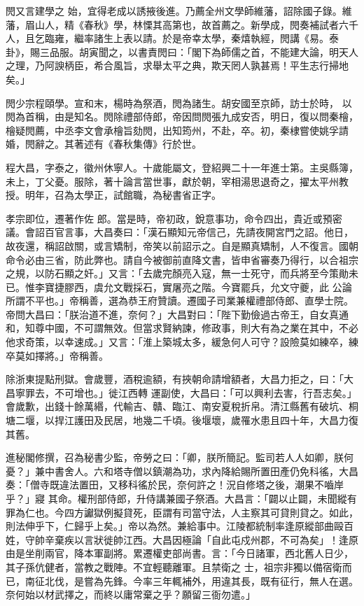 \begin{pinyinscope}
 閌又言建學之
 始，宜得老成以誘掖後進。乃薦全州文學師維藩，詔除國子錄。維藩，眉山人，精《春秋》學，林慄其高第也，故首薦之。新學成，閌奏補試者六千人，且乞臨雍，繼率諸生上表以請。於是帝幸太學，秦熺執經，閌講《易。泰卦》，賜三品服。胡寅聞之，以書責閌曰：「閣下為師儒之首，不能建大論，明天人之理，乃阿諛柄臣，希合風旨，求舉太平之典，欺天罔人孰甚焉！平生志行掃地矣。」



 閌少宗程頤學。宣和末，楊時為祭酒，閌為諸生。胡安國至京師，訪士於時，
 以閌為首稱，由是知名。閌除禮部侍郎，帝因問閌張九成安否，明日，復以問秦檜，檜疑閌薦，中丞李文會承檜旨劾閌，出知筠州，不赴，卒。初，秦棣嘗使姚孚請婚，閌辭之。其著述有《春秋集傳》行於世。



 程大昌，字泰之，徽州休寧人。十歲能屬文，登紹興二十一年進士第。主吳縣簿，未上，丁父憂。服除，著十論言當世事，獻於朝，宰相湯思退奇之，擢太平州教授。明年，召為太學正，試館職，為秘書省正字。



 孝宗即位，遷著作佐
 郎。當是時，帝初政，銳意事功，命令四出，貴近或預密議。會詔百官言事，大昌奏曰：「漢石顯知元帝信己，先請夜開宮門之詔。他日，故夜還，稱詔啟關，或言矯制，帝笑以前詔示之。自是顯真矯制，人不復言。國朝命令必由三省，防此弊也。請自今被御前直降文書，皆申省審奏乃得行，以合祖宗之規，以防石顯之奸。」又言：「去歲完顏亮入寇，無一士死守，而兵將至今策勛未已。惟李寶捷膠西，虞允文戰採石，實屠亮之階。今寶罷兵，允文守夔，此
 公論所謂不平也。」帝稱善，選為恭王府贊讀。遷國子司業兼權禮部侍郎、直學士院。帝問大昌曰：「朕治道不進，奈何？」大昌對曰：「陛下勤儉過古帝王，自女真通和，知尊中國，不可謂無效。但當求賢納諫，修政事，則大有為之業在其中，不必他求奇策，以幸速成。」又言：「淮上築城太多，緩急何人可守？設險莫如練卒，練卒莫如擇將。」帝稱善。



 除浙東提點刑獄。會歲豐，酒稅逾額，有挾朝命請增額者，大昌力拒之，曰：「大昌寧罪去，不可增也。」徙江西轉
 運副使，大昌曰：「可以興利去害，行吾志矣。」會歲歉，出錢十餘萬緡，代輸吉、贛、臨江、南安夏稅折帛。清江縣舊有破坑、桐塘二堰，以捍江護田及民居，地幾二千頃。後堰壞，歲罹水患且四十年，大昌力復其舊。



 進秘閣修撰，召為秘書少監，帝勞之曰：「卿，朕所簡記。監司若人人如卿，朕何憂？」兼中書舍人。六和塔寺僧以鎮潮為功，求內降給賜所置田產仍免科徭，大昌奏：「僧寺既違法置田，又移科徭於民，奈何許之！況自修塔之後，潮果不嚙岸乎？」寢
 其命。權刑部侍郎，升侍講兼國子祭酒。大昌言：「闢以止闢，未聞縱有罪為仁也。今四方讞獄例擬貸死，臣謂有司當守法，人主察其可貸則貸之。如此，則法伸乎下，仁歸乎上矣。」帝以為然。兼給事中。江陵都統制率逢原縱部曲毆百姓，守帥辛棄疾以言狀徙帥江西。大昌因極論「自此屯戍州郡，不可為矣」！逢原由是坐削兩官，降本軍副將。累遷權吏部尚書。言：「今日諸軍，西北舊人日少，其子孫伉健者，當教之戰陣。不宜輕聽離軍。且禁衛之
 士，祖宗非獨以備宿衛而已，南征北伐，是嘗為先鋒。今率三年輒補外，用違其長，既有征行，無人在選。奈何始以材武擇之，而終以庸常棄之乎？願留三衙勿遣。」




\end{pinyinscope}
